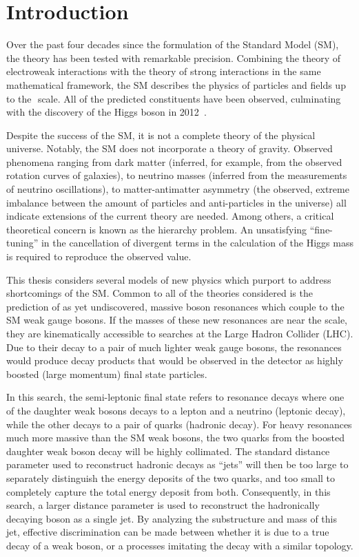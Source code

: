 \chapter{Introduction}
\label{ch:intro}

Over the past four decades since the formulation of the Standard Model (SM), the theory has been tested with remarkable precision. 
Combining the theory of electroweak interactions with the theory of strong interactions in the same mathematical framework, the SM describes the physics of particles and fields up to the\,\TeV\, scale. All of the predicted constituents have been observed, culminating with the discovery of the Higgs boson in 2012~\cite{Higgs_atlas,Higgs_cms}.

Despite the success of the SM, it is not a complete theory of the physical universe. Notably, the SM does not incorporate a theory of gravity. Observed phenomena ranging from dark matter (inferred, for example, from the observed rotation curves of galaxies), to neutrino masses (inferred from the measurements of neutrino oscillations), to matter-antimatter asymmetry (the observed, extreme imbalance between the amount of particles and anti-particles in the universe) all indicate extensions of the current theory are needed. Among others, a critical theoretical concern is known as the hierarchy problem. An unsatisfying ``fine-tuning'' in the cancellation of divergent terms in the calculation of the Higgs mass is required to reproduce the observed value. 

This thesis considers several models of new physics which purport to address shortcomings of the SM. Common to all of the theories considered is the prediction of as yet undiscovered, massive boson resonances which couple to the SM weak gauge bosons. If the masses of these new resonances are near the\,\TeV\,scale, they are kinematically accessible to searches at the Large Hadron Collider (LHC). Due to their decay to a pair of much lighter weak gauge bosons, the resonances would produce decay products that would be observed in the detector as highly boosted (large momentum) final state particles. 

In this search, the semi-leptonic final state refers to resonance decays where one of the daughter weak bosons decays to a lepton and a neutrino (leptonic decay), while the other decays to a pair of quarks (hadronic decay). For heavy resonances much more massive than the SM weak bosons, the two quarks from the boosted daughter weak boson decay will be highly collimated. The standard distance parameter used to reconstruct hadronic decays as ``jets'' will then be too large to separately distinguish the energy deposits of the two quarks, and too small to completely capture the total energy deposit from both. Consequently, in this search, a larger distance parameter is used to reconstruct the hadronically decaying boson as a single jet. By analyzing the substructure and mass of this jet, effective discrimination can be made between whether it is due to a true decay of a weak boson, or a processes imitating the decay with a similar topology.

